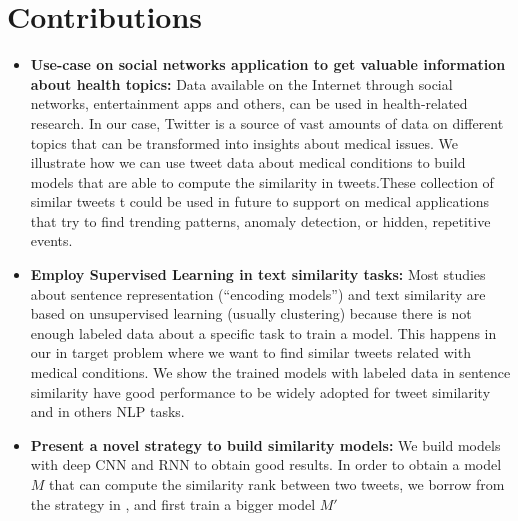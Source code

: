 \documentclass[12pt]{report}
\begin{document}
	\section{Contributions}
	\begin{itemize}[nolistsep]
		\item \textbf{Use-case on social networks application to get valuable information about health topics:}  Data available on the Internet through social networks, entertainment apps and others, can be used in health-related research. In our case,  Twitter is a source of vast amounts of data on different topics that can be transformed into insights about  medical issues. We illustrate  how we can use tweet data about medical conditions to build models that are able to compute the similarity in tweets.These collection of similar tweets  t could be used in future to support on medical applications that try to find trending patterns, 
		anomaly detection, or hidden, repetitive events. 
		\item \textbf{Employ Supervised Learning in text similarity tasks:} Most studies about sentence representation (``encoding models'') and text similarity are based on unsupervised learning (usually clustering) because there is not enough labeled data about a specific task to train a model. This happens in our 
		in target problem where we want to find similar tweets related with medical conditions. We show the trained models with labeled data in sentence similarity have good performance to be widely adopted for tweet similarity and in others \ac{NLP} tasks.
		\item \textbf{Present a novel strategy to build similarity models: } We build models with deep \ac{CNN} and \ac{RNN} to obtain good results. 
		In order to obtain a model $M$ that can compute the similarity rank between two tweets, we borrow from the strategy in \cite{Wang2014}, and first train a bigger model $M'$

\end{itemize}
\end{document}
